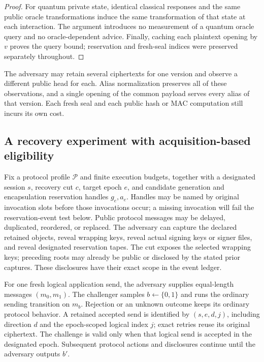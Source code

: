 \begin{proof}
For quantum private state, identical classical responses and the same public
oracle transformations induce the same transformation of that state at
each interaction.  The argument introduces no measurement of a quantum
oracle query and no oracle-dependent advice.  Finally, caching each
plaintext opening by $v$ proves the query bound; reservation and fresh-seal
indices were preserved separately throughout.
\end{proof}

The adversary may retain several ciphertexts for one version and observe
a different public head for each. Alias normalization preserves all of
these observations, and a single opening of the common payload serves
every alias of that version. Each fresh seal and each public hash or MAC
computation still incurs its own cost.




\subsection{A recovery experiment with acquisition-based eligibility}

\begin{definition}
\label{def:recovery-game}
Fix a protocol profile $\mathcal P$ and finite execution budgets, together with
a designated session $s$, recovery cut $c$, target epoch $e$, and candidate
generation and encapsulation reservation handles $g_e,a_e$.  Handles may be
named by original invocation slots before those invocations occur; a missing
invocation will fail the reservation-event test below.  Public
protocol messages may be delayed, duplicated, reordered, or replaced.
The adversary can capture the declared retained objects, reveal wrapping
keys, reveal actual signing keys or signer files, and reveal designated
reservation tapes.  The cut exposes the selected wrapping keys; preceding
roots may already be public or disclosed by the stated prior captures.
These disclosures have their exact scope in the event ledger.

For one fresh logical application send, the adversary supplies equal-length
messages $(m_0,m_1)$.  The challenger samples $b\leftarrow\{0,1\}$ and runs
the ordinary sending transition on $m_b$.  Rejection or an unknown outcome
keeps its ordinary protocol behavior.  A retained accepted send is identified
by $(s,e,d,j)$, including direction $d$ and the epoch-scoped logical index $j$;
exact retries reuse its original ciphertext.  The challenge is valid only
when that logical send is accepted in the designated epoch.  Subsequent
protocol actions and disclosures continue until the adversary outputs $b'$.
\end{definition}


